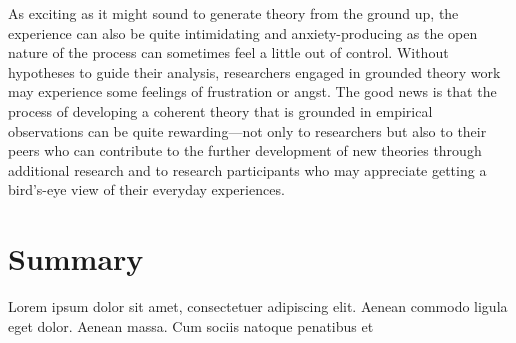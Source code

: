 As exciting as it might sound to generate theory from the ground up, the experience can also be quite intimidating and anxiety-producing as the open nature of the process can sometimes feel a little out of control. Without hypotheses to guide their analysis, researchers engaged in grounded theory work may experience some feelings of frustration or angst. The good news is that the process of developing a coherent theory that is grounded in empirical observations can be quite rewarding—not only to researchers but also to their peers who can contribute to the further development of new theories through additional research and to research participants who may appreciate getting a bird’s-eye view of their everyday experiences.


\section{Summary}\label{ch13:summary}

Lorem ipsum dolor sit amet, consectetuer adipiscing elit. Aenean commodo ligula eget dolor. Aenean massa. Cum sociis natoque penatibus et
